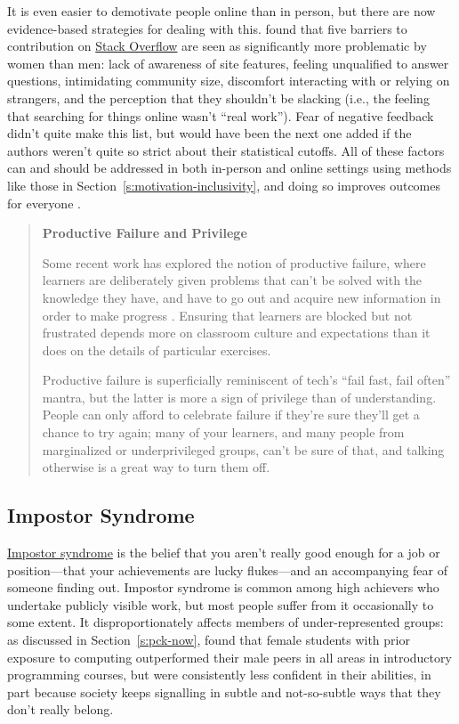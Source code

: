 It is even easier to demotivate people online than in person, but
there are now evidence-based strategies for dealing with this.
\cite{Ford2016} found that five barriers to contribution on \href{https://stackoverflow.com/}{Stack
Overflow} are seen as significantly more problematic
by women than men: lack of awareness of site features, feeling
unqualified to answer questions, intimidating community size,
discomfort interacting with or relying on strangers, and the
perception that they shouldn't be slacking (i.e., the feeling that
searching for things online wasn't ``real work''). Fear of negative
feedback didn't quite make this list, but would have been the next one
added if the authors weren't quite so strict about their statistical
cutoffs. All of these factors can and should be addressed in both
in-person and online settings using methods like those in
Section~\ref{s:motivation-inclusivity}, and doing so improves outcomes
for everyone \cite{Sved2016}.

\begin{quote}\setlength{\parindent}{0pt}
\textbf{Productive Failure and Privilege}

Some recent work has explored the notion of productive failure, where
learners are deliberately given problems that can't be solved with the
knowledge they have, and have to go out and acquire new information in
order to make progress \cite{Kapu2016}. Ensuring that learners are
blocked but not frustrated depends more on classroom culture and
expectations than it does on the details of particular exercises.

Productive failure is superficially reminiscent of tech's ``fail fast,
fail often'' mantra, but the latter is more a sign of privilege than of
understanding. People can only afford to celebrate failure if they're
sure they'll get a chance to try again; many of your learners, and
many people from marginalized or underprivileged groups, can't be sure
of that, and talking otherwise is a great way to turn them off.
\end{quote}

\subsection{Impostor Syndrome}\label{impostor-syndrome}

\protect\hyperlink{g:impostor-syndrome}{Impostor syndrome} is the belief that
you aren't really good enough for a job or position---that your
achievements are lucky flukes---and an accompanying fear of someone
finding out. Impostor syndrome is common among high achievers who
undertake publicly visible work, but most people suffer from it
occasionally to some extent. It disproportionately affects members of
under-represented groups: as discussed in Section~\ref{s:pck-now},
\cite{Wilc2018} found that female students with prior exposure to
computing outperformed their male peers in all areas in introductory
programming courses, but were consistently less confident in their
abilities, in part because society keeps signalling in subtle and
not-so-subtle ways that they don't really belong.

